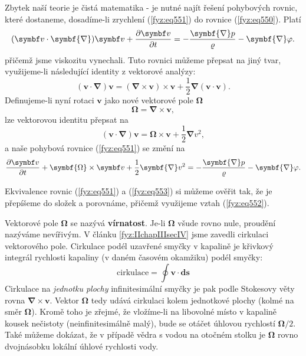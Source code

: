 {    Zbytek naší teorie je čistá matematika - je nutné najít řešení pohybových rovnic, které 
    dostaneme, dosadíme-li zrychlení (\ref{fyz:eq551}) do rovnice (\ref{fyz:eq550}). Platí
    \begin{equation}\label{fyz:eq551}
      (\bm{v}\cdot\symbf{\nabla})\bm{v}+\pder{\bm{v}}{t} 
        = -\dfrac{\symbf{\nabla}p}{\varrho} -\symbf{\nabla}\varphi.
    \end{equation}
    přičemž jsme viskozitu vynechali. Tuto rovnici můžeme přepsat na jiný tvar, využijeme-li 
    následující identity z vektorové analýzy:
    \begin{equation*}
      (\bm{v}\cdot\symbf{\nabla})\bm{v} 
        = (\symbf{\nabla}\times\bm{v})\times\bm{v} + \frac{1}{2}\symbf{\nabla}(\bm{v}\cdot\bm{v}).
    \end{equation*}
    Definujeme-li nyní rotaci \(\bm{v}\) jako nové vektorové pole \(\symbf{\Omega}\)  
    \begin{equation}\label{fyz:eq552}
      \symbf{\Omega} = \symbf{\nabla}\times\bm{v},
    \end{equation}
    lze vektorovou identitu přepsat na
    \begin{equation*}
      (\bm{v}\cdot\symbf{\nabla})\bm{v} 
        = \symbf{\Omega}\times\bm{v} + \frac{1}{2}\symbf{\nabla}v^2,
    \end{equation*}
    a naše pohybová rovnice (\ref{fyz:eq551}) se změní na
    \begin{equation}\label{fyz:eq553}
      \pder{\bm{v}}{t} + \symbf{\Omega}\times\bm{v} + \frac{1}{2}\symbf{\nabla}v^2
        = -\dfrac{\symbf{\nabla}p}{\varrho} -\symbf{\nabla}\varphi.
    \end{equation}
    
    Ekvivalence rovnic (\ref{fyz:eq551}) a (\ref{fyz:eq553}) si můžeme ověřit tak, že je přepíšeme 
    do složek a porovnáme, přičemž využijeme vztah (\ref{fyz:eq552}).
    
    Vektorové pole \(\symbf{\Omega}\) se nazývá \textbf{vírnatost}. Je-li \(\symbf{\Omega}\) všude 
    rovno nule, proudění nazýváme nevířivým. V článku \ref{fyz:IIchapIIIsecIV} jsme zavedli 
    cirkulaci vektorového pole. Cirkulace podél uzavřené smyčky v kapalině je křivkový integrál 
    rychlosti kapaliny (v daném časovém okamžiku) podél smyčky:
    \begin{equation*}
      \text{cirkulace} = \oint\bm{v}\cdot\bm{ds}
    \end{equation*}
    Cirkulace na \emph{jednotku plochy} infinitesimální smyčky je pak podle Stokesovy věty rovna 
    \(\symbf{\nabla}\times\bm{v}\). Vektor \(\symbf{\Omega}\) tedy udává cirkulaci kolem jednotkové 
    plochy (kolmé na směr \(\symbf{\Omega}\)). Kromě toho je zřejmé, že vložíme-li na libovolné 
    místo v kapalině kousek nečistoty (neinfinitesimálně malý), bude se otáčet úhlovou rychlostí 
    \(\symbf{\Omega}/2\). Také můžeme dokázat, že v případě vědra s vodou na otočném stolku je 
    \(\symbf{\Omega}\) rovno dvojnásobku lokální úhlové rychlosti vody.
    
}
